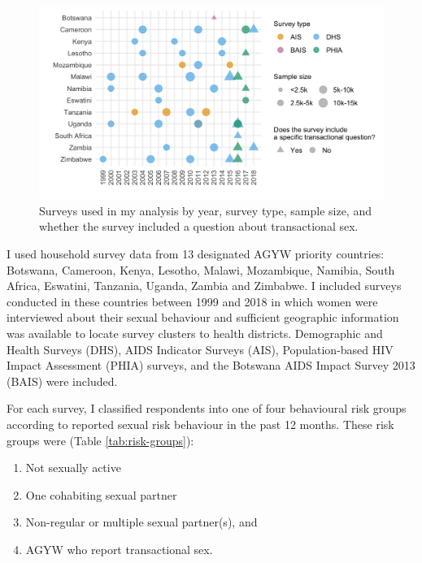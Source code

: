 \documentclass[a4paper, nobind]{templates/ociamthesis}
\providecommand{\tightlist}{%
  \setlength{\itemsep}{0pt}\setlength{\parskip}{0pt}}
\begin{document}
\begin{figure}

{\centering \includegraphics[width=0.95\linewidth]{resources/multi-agyw/20230627-144735-3da88508/depends/available-surveys} 

}

\caption{Surveys used in my analysis by year, survey type, sample size, and whether the survey included a question about transactional sex.}\label{fig:available-surveys}
\end{figure}

I used household survey data from 13 designated AGYW priority countries: Botswana, Cameroon, Kenya, Lesotho, Malawi, Mozambique, Namibia, South Africa, Eswatini, Tanzania, Uganda, Zambia and Zimbabwe.
I included surveys conducted in these countries between 1999 and 2018 in which women were interviewed about their sexual behaviour and sufficient geographic information was available to locate survey clusters to health districts.
Demographic and Health Surveys (DHS), AIDS Indicator Surveys (AIS), Population-based HIV Impact Assessment (PHIA) surveys, and the Botswana AIDS Impact Survey 2013 (BAIS) were included.

For each survey, I classified respondents into one of four behavioural risk groups according to reported sexual risk behaviour in the past 12 months.
These risk groups were (Table \ref{tab:risk-groups}):

\begin{enumerate}
\def\labelenumi{\arabic{enumi}.}
\tightlist
\item
  Not sexually active
\item
  One cohabiting sexual partner
\item
  Non-regular or multiple sexual partner(s), and
\item
  AGYW who report transactional sex.
\end{enumerate}
\end{document}
